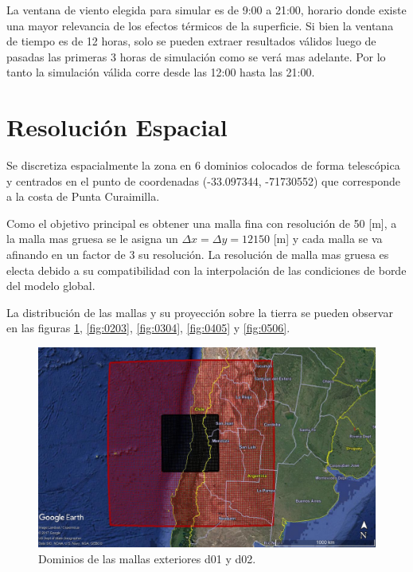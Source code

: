 La ventana de viento elegida para simular es de 9:00 a 21:00, horario donde existe una mayor relevancia de los efectos térmicos de la superficie. Si bien la ventana de tiempo es de 12 horas, solo se pueden extraer resultados válidos luego de pasadas las primeras 3 horas de simulación como se verá mas adelante. Por lo tanto la simulación válida corre desde las 12:00 hasta las 21:00.
\section{Resolución Espacial}
Se discretiza espacialmente la zona en 6 dominios colocados de forma telescópica y centrados en el punto de coordenadas (-33.097344, -71730552) que corresponde a la costa de Punta Curaimilla.

Como el objetivo principal es obtener una malla fina con resolución de 50 [m], a la malla mas gruesa se le asigna un $\Delta x = \Delta y = 12150$ [m] y cada malla se va afinando en un factor de 3 su resolución. La resolución de malla mas gruesa es electa debido a su compatibilidad con la interpolación de las condiciones de borde del modelo global.

La distribución de las mallas y su proyección sobre la tierra se pueden observar en las figuras \ref{fig:0102}, \ref{fig:0203}, \ref{fig:0304}, \ref{fig:0405} y \ref{fig:0506}.

\begin{figure}[H]
	\centering
	\includegraphics[width=0.95\linewidth]{Imagenes/d06d05}
	\caption{Dominios de las mallas exteriores d01 y d02.}
	\label{fig:0102}
\end{figure}

